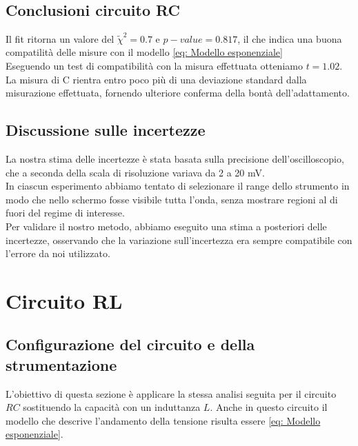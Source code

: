 \documentclass[letterpaper,12pt]{article}
\begin{document}
 \\


\subsection{Conclusioni circuito RC}
Il fit ritorna un valore del $\widetilde{\chi}^2 = 0.7$ e $p-value = 0.817$, il che indica una buona compatilità delle misure con il modello \eqref{eq: Modello esponenziale}\\

Eseguendo un test di compatibilità con la misura effettuata otteniamo $t = 1.02$. \\

La misura di C rientra entro poco più di una deviazione standard dalla misurazione effettuata, fornendo ulteriore conferma della bontà dell'adattamento.

\subsection{Discussione sulle incertezze}

La nostra stima delle incertezze è stata basata sulla precisione dell'oscilloscopio, che a seconda della scala di risoluzione variava da 2 a 20 mV. \\
In ciascun esperimento abbiamo tentato di selezionare il range dello strumento in modo che nello schermo fosse visibile tutta l'onda, senza mostrare regioni al di fuori del regime di interesse.\\
Per validare il nostro metodo, abbiamo eseguito una stima a posteriori delle incertezze, osservando che la variazione sull'incertezza era sempre compatibile con l'errore da noi utilizzato.
\newpage
\section{Circuito RL}

\subsection{Configurazione del circuito e della strumentazione}
L'obiettivo di questa sezione è applicare la stessa analisi seguita per il circuito $RC$ sostituendo la capacità con un induttanza $L$.
Anche in questo circuito il modello che descrive l'andamento della tensione risulta essere \eqref{eq: Modello esponenziale}.
\end{document}
